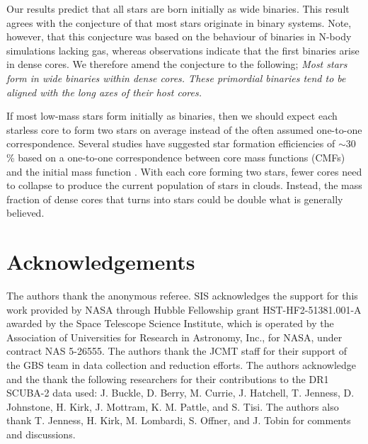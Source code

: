 \documentclass[usenatbib,a4paper]{mnras}
\begin{document}
Our results predict that all stars are born initially as wide binaries.  This result agrees with the conjecture of \cite{Kroupa08} that most stars originate in binary systems.  Note, however, that this conjecture was based on the behaviour of binaries in N-body simulations lacking gas, whereas observations indicate that the first binaries arise in dense cores.  We therefore amend the conjecture to the following; \emph{Most stars form in wide binaries within dense cores.  These primordial binaries tend to be aligned with the long axes of their host cores.}

If most low-mass stars form initially as binaries, then we should expect each starless core to form two stars on average instead of the often assumed one-to-one correspondence.  Several studies have suggested star formation efficiencies of $\sim 30$\% based on a one-to-one correspondence between core mass functions (CMFs) and the initial mass function \citep[IMF; e.g., see ][]{Alves07}.  With each core forming two stars, fewer cores need to collapse to produce the current population of stars in clouds.  Instead, the mass fraction of dense cores that turns into stars could be double what is generally believed.  
 

\vspace{1cm}
\section*{Acknowledgements}
The authors thank the anonymous referee.  SIS acknowledges the support for this work provided by NASA through Hubble Fellowship grant HST-HF2-51381.001-A awarded by the Space Telescope Science Institute, which is operated by the Association of Universities for Research in Astronomy, Inc., for NASA, under contract NAS 5-26555.  The authors thank the JCMT staff for their support of the GBS team in data collection and reduction efforts.  The authors acknowledge and the thank the following researchers for their contributions to the DR1 SCUBA-2 data used: J. Buckle, D. Berry, M. Currie, J. Hatchell, T. Jenness, D. Johnstone, H. Kirk, J. Mottram, K. M. Pattle, and S. Tisi.  The authors also thank T. Jenness, H. Kirk, M. Lombardi, S. Offner, and J. Tobin for comments and discussions.
\end{document}
